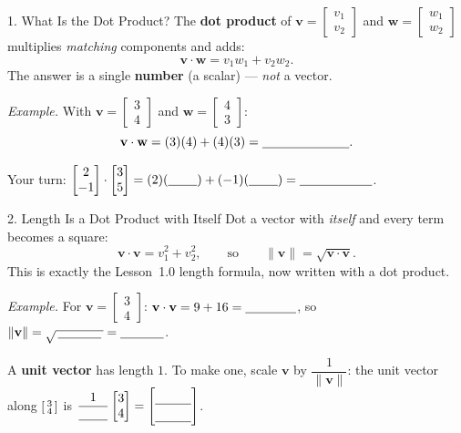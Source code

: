 \documentclass[10pt]{article}
\newcommand{\vv}{\mathbf{v}}
\newcommand{\ww}{\mathbf{w}}
\begin{document}
\begin{notesbox}{1. What Is the Dot Product?}
The \textbf{dot product} of $\vv=\begin{bmatrix} v_1 \\ v_2 \end{bmatrix}$ and
$\ww=\begin{bmatrix} w_1 \\ w_2 \end{bmatrix}$ multiplies \emph{matching} components and adds:
\[
  \vv\cdot\ww = v_1 w_1 + v_2 w_2 .
\]
The answer is a single \textbf{number} (a scalar) --- \emph{not} a vector.

\vspace{2pt}
\textit{Example.} With $\vv=\begin{bmatrix} 3 \\ 4 \end{bmatrix}$ and $\ww=\begin{bmatrix} 4 \\ 3 \end{bmatrix}$:
\[
  \vv\cdot\ww = (3)(4) + (4)(3) = \blank{2.4cm}.
\]

\vspace{2pt}
Your turn: $\begin{bmatrix} 2 \\ -1 \end{bmatrix}\cdot\begin{bmatrix} 3 \\ 5 \end{bmatrix}
= (2)(\underline{\hspace{0.8cm}}) + (-1)(\underline{\hspace{0.8cm}}) = \blank{2.0cm}$.
\end{notesbox}

\begin{notesbox}{2. Length Is a Dot Product with Itself}
Dot a vector with \emph{itself} and every term becomes a square:
\[
  \vv\cdot\vv = v_1^2 + v_2^2 , \qquad\text{so}\qquad \|\vv\| = \sqrt{\vv\cdot\vv}.
\]
This is exactly the Lesson~1.0 length formula, now written with a dot product.

\vspace{2pt}
\textit{Example.} For $\vv=\begin{bmatrix} 3 \\ 4 \end{bmatrix}$:
$\vv\cdot\vv = 9 + 16 = \blank{1.4cm}$, so $\|\vv\| = \sqrt{\,\blank{1.2cm}\,} = \blank{1.2cm}$.

\vspace{2pt}
A \textbf{unit vector} has length $1$. To make one, scale $\vv$ by $\dfrac{1}{\|\vv\|}$:
the unit vector along $\begin{bsmallmatrix} 3\\4 \end{bsmallmatrix}$ is
$\dfrac{1}{\blank{0.8cm}}\begin{bmatrix} 3 \\ 4 \end{bmatrix}
= \begin{bmatrix}\rule{0pt}{1.1em}\blank{1.0cm}\\[2pt]\blank{1.0cm}\end{bmatrix}$.
\end{notesbox}
\end{document}
